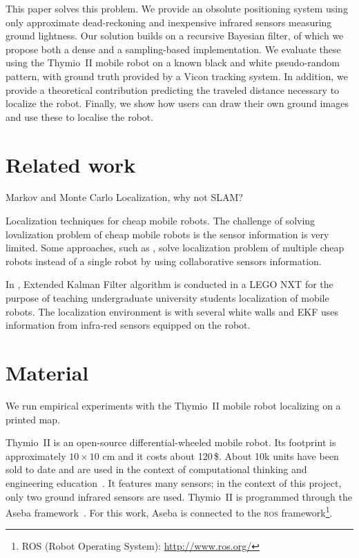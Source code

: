 \documentclass[letterpaper, 10pt, conference]{ieeeconf}
\begin{document}
This paper solves this problem.
We provide an obsolute positioning system using only approximate dead-reckoning and inexpensive infrared sensors measuring ground lightness.
Our solution builds on a recursive Bayesian filter, of which we propose both a dense and a sampling-based implementation.
We evaluate these using the Thymio~II mobile robot on a known black and white pseudo-random pattern, with ground truth provided by a Vicon tracking system.
In addition, we provide a theoretical contribution predicting the traveled distance necessary to localize the robot.
Finally, we show how users can draw their own ground images and use these to localise the robot.

\section{Related work}

Markov and Monte Carlo Localization, why not SLAM?

Localization techniques for cheap mobile robots.
The challenge of solving lovalization problem of cheap mobile robots is the sensor information is very limited.
Some approaches, such as \cite{prorok2012low, dias2013absolute}, solve localization problem of multiple cheap robots instead of a single robot by using collaborative sensors information.

In \cite{pinto2012localization}, Extended Kalman Filter algorithm is conducted in a LEGO NXT for the purpose of teaching undergraduate university students localization of mobile robots.
The localization environment is with several white walls and EKF uses information from infra-red sensors equipped on the robot.


\section{Material}

We run empirical experiments with the Thymio~II mobile robot localizing on a printed map.

Thymio~II is an open-source differential-wheeled mobile robot.
Its footprint is approximately $10 \times 10$ cm and it costs about 120\,\$.
About 10k units have been sold to date and are used in the context of computational thinking and engineering education~\cite{magnenat2012arso}.
It features many sensors; in the context of this project, only two ground infrared sensors are used. %
Thymio~II is programmed through the Aseba framework~\cite{aseba2011tmech}.
For this work, Aseba is connected to the \textsc{ros} framework\footnote{ROS (Robot Operating System): \url{http://www.ros.org/}}.
\end{document}
